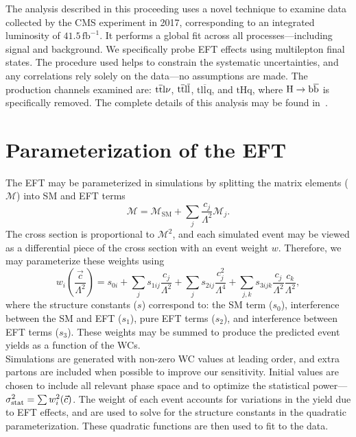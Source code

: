 \documentclass[12pt]{article}
\begin{document}
The analysis described in this proceeding uses a novel technique to examine data collected by the CMS experiment in 2017, corresponding to an integrated luminosity of $41.5\,\mathrm{fb^{-1}}$. It performs a global fit across all processes---including signal and background. We specifically probe EFT effects using multilepton final states. The procedure used helps to constrain the systematic uncertainties, and any correlations rely solely on the data---no assumptions are made. The production channels examined are: $\mathrm{\mathrm{t\overline{t}} l\nu}$, $\mathrm{\mathrm{t\overline{t}} l\overline{l}}$, $\mathrm{t l\overline{l}q}$, and $\mathrm{tHq}$, where $\mathrm{H \to \mathrm{b\overline{b}}}$ is specifically removed. The complete details of this analysis may be found in~\cite{Sirunyan:2020tqm}.\\

\section{Parameterization of the EFT}

The EFT may be parameterized in simulations by splitting the matrix elements ($\mathcal{M}$) into SM and EFT terms
\begin{equation}
	\mathcal{M} = \mathcal{M}_{\mathrm{SM}} + \sum_{j} \frac{c_j}{\Lambda^2} \mathcal{M}_j.
\end{equation}
The cross section is proportional to $\mathcal{M}^2$, and each simulated event may be viewed as a differential piece of the cross section with an event weight $w$. Therefore, we may parameterize these weights using
\begin{equation}
	w_i\left(\frac{\vec{c}}{\Lambda^2}\right) = s_{0i} + \sum_js_{1ij}\frac{c_j}{\Lambda^2} + \sum_js_{2ij}\frac{c_j^2}{\Lambda^4} + \sum_{j,k}s_{3ijk} \frac{c_j}{\Lambda^2} \frac{c_k}{\Lambda^2},
\end{equation}
where the structure constants ($s$) correspond to: the SM term ($s_0$), interference between the SM and EFT ($s_1$), pure EFT terms ($s_2$), and interference between EFT terms ($s_3$). These weights may be summed to produce the predicted event yields as a function of the WCs.\\

Simulations are generated with non-zero WC values at leading order, and extra partons are included when possible to improve our sensitivity. Initial values are chosen to include all relevant phase space and to optimize the statistical power---$\sigma^2_{\mathrm{stat}} = \sum w^2_i(\vec{c})$. The weight of each event accounts for variations in the yield due to EFT effects, and are used to solve for the structure constants in the quadratic parameterization. These quadratic functions are then used to fit to the data.\\
\end{document}
